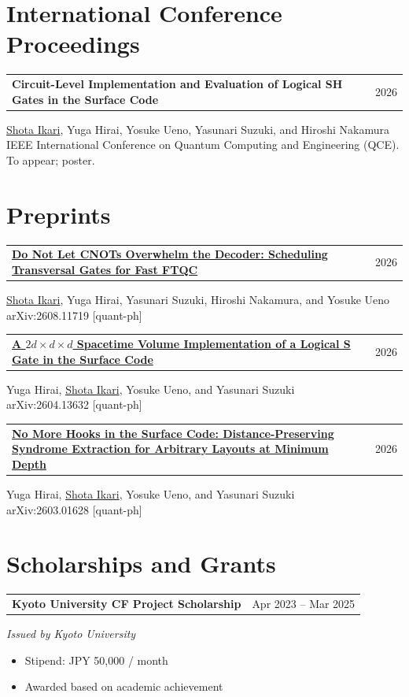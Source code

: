 \documentclass[11pt,a4paper]{article}
\makeatletter
\newenvironment{entry}[2]{%
  \par\addvspace{4pt}\noindent\begin{minipage}{\linewidth}
  \raggedright
  \begin{tabularx}{\linewidth}{@{}>{\raggedright\arraybackslash}X@{\hspace{12pt}}r@{}}
    #1 & #2
  \end{tabularx}\par\vspace{1pt}
}{\end{minipage}\par}
\newcommand{\me}{\underline{Shota Ikari}}
\makeatother
\begin{document}
\section{International Conference Proceedings}
\begin{entry}{\textbf{Circuit-Level Implementation and Evaluation of Logical SH Gates in the Surface Code}}{2026}
  \me, Yuga Hirai, Yosuke Ueno, Yasunari Suzuki, and Hiroshi Nakamura\\
  IEEE International Conference on Quantum Computing and Engineering (QCE). To appear; poster.
\end{entry}

\section{Preprints}
\begin{entry}{\textbf{\href{https://arxiv.org/abs/2608.11719}{Do Not Let CNOTs Overwhelm the Decoder: Scheduling Transversal Gates for Fast FTQC}}}{2026}
  \me, Yuga Hirai, Yasunari Suzuki, Hiroshi Nakamura, and Yosuke Ueno\\
  arXiv:2608.11719 [quant-ph]
\end{entry}
\begin{entry}{\textbf{\href{https://arxiv.org/abs/2604.13632}{A $2d \times d \times d$ Spacetime Volume Implementation of a Logical S Gate in the Surface Code}}}{2026}
  Yuga Hirai, \me, Yosuke Ueno, and Yasunari Suzuki\\
  arXiv:2604.13632 [quant-ph]
\end{entry}
\begin{entry}{\textbf{\href{https://arxiv.org/abs/2603.01628}{No More Hooks in the Surface Code: Distance-Preserving Syndrome Extraction for Arbitrary Layouts at Minimum Depth}}}{2026}
  Yuga Hirai, \me, Yosuke Ueno, and Yasunari Suzuki\\
  arXiv:2603.01628 [quant-ph]
\end{entry}

\section{Scholarships and Grants}
\begin{entry}{\textbf{Kyoto University CF Project Scholarship}}{Apr 2023 -- Mar 2025}
  \textit{Issued by Kyoto University}
  \begin{itemize}
    \item Stipend: JPY 50,000 / month
    \item Awarded based on academic achievement
  \end{itemize}
\end{entry}
\end{document}
